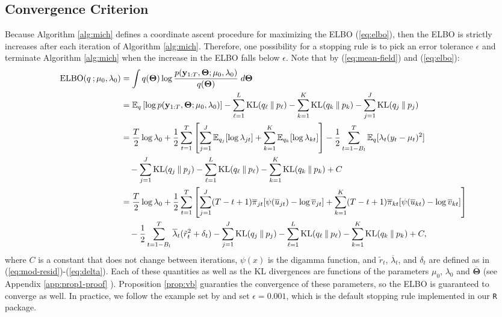 \subsection{Convergence Criterion}
\label{app:convergence}

Because Algorithm \ref{alg:mich} defines a coordinate ascent procedure for maximizing the ELBO (\ref{eq:elbo}), then the ELBO is strictly increases after each iteration of Algorithm \ref{alg:mich}. Therefore, one possibility for a stopping rule is to pick an error tolerance $\epsilon$ and terminate Algorithm \ref{alg:mich} when the increase in the ELBO falls below $\epsilon$. Note that by (\ref{eq:mean-field}) and  (\ref{eq:elbo}):
\begin{align*}
    \text{ELBO}(q\:;\mu_0,\lambda_0) &= \int q(\boldsymbol{\Theta}) \log \frac{ p(\mathbf{y}_{1:T},\boldsymbol{\Theta};\mu_0,\lambda_0)}{q(\boldsymbol{\Theta})} \; d\boldsymbol{\Theta} \\
    &= \mathbb{E}_q\left[\log p(\mathbf{y}_{1:T},\boldsymbol{\Theta};\mu_0,\lambda_0)\right] - \sum_{\ell=1}^L \text{KL}(q_\ell\:\lVert\: p_\ell) - \sum_{k=1}^K \text{KL}(q_k\:\lVert\: p_k) -\sum_{j=1}^J \text{KL}(q_j\:\lVert\: p_j) \\
    &= \frac{T  }{2} \log \lambda_0 + \frac{1}{2}\sum_{t=1}^T \left[\sum_{j=1}^J \mathbb{E}_{q_j}[\log \lambda_{jt}]+ \sum_{k=1}^K \mathbb{E}_{q_k}[\log \lambda_{kt}]\right] - \frac{1}{2} \sum_{t=1-B_l}^{T} \mathbb{E}_q[\lambda_t(y_t -\mu_t)^2] \\
    &\quad - \sum_{j=1}^J \text{KL}(q_j\:\lVert\: p_j) - \sum_{\ell=1}^L \text{KL}(q_\ell\:\lVert\: p_\ell) - \sum_{k=1}^K \text{KL}(q_k\:\lVert\: p_k) +C \\
    &= \frac{T  }{2} \log \lambda_0 + \frac{1}{2}\sum_{t=1}^T \left[\sum_{j=1}^J (T-t+1)\overline{\pi}_{jt}[\psi(\overline{u}_{jt}) - \log\overline{v}_{jt}]+ \sum_{k=1}^K(T-t+1)\overline{\pi}_{kt}[\psi(\overline{u}_{kt}) - \log\overline{v}_{kt}]\right] \\
    &\quad- \frac{1}{2} \sum_{t=1-B_l}^{T} \overline{\lambda}_t(\Tilde{r}_t^2 + \delta_t) - \sum_{j=1}^J \text{KL}(q_j\:\lVert\: p_j) - \sum_{\ell=1}^L \text{KL}(q_\ell\:\lVert\: p_\ell) - \sum_{k=1}^K \text{KL}(q_k\:\lVert\: p_k) +C,
\end{align*}
\normalsize
where $C$ is a constant that does not change between iterations, $\psi(x)$ is the digamma function, and $\tilde{r}_t$, $\overline{\lambda}_t$, and $\delta_t$ are defined as in (\ref{eq:mod-resid})-(\ref{eq:delta}). Each of these quantities as well as the KL divergences are functions of the parameters $\mu_0$, $\lambda_0$ and $\overline{\boldsymbol{\Theta}}$ (see Appendix \ref{app:prop1-proof} ). Proposition \ref{prop:vb} guaranties the convergence of these parameters, so the ELBO is guaranteed to converge as well. In practice, we follow the example set by \cite{Wang20} and set $\epsilon = 0.001$, which is the default stopping rule implemented in our \texttt{R} package.